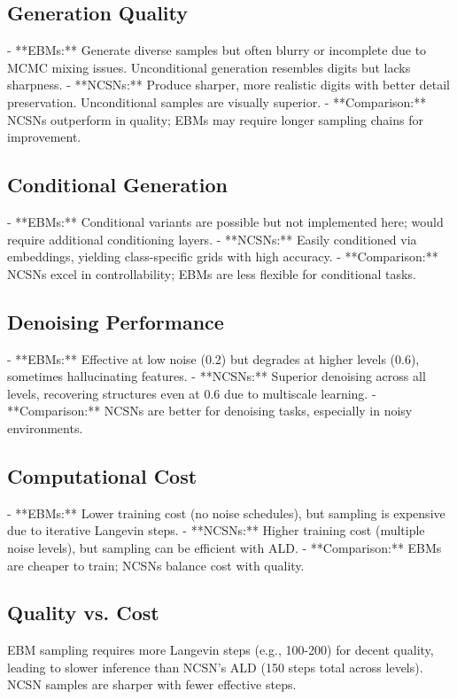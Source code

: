 \documentclass[a4paper,12pt]{article}
\begin{document}
\subsection{Generation Quality}
- **EBMs:** Generate diverse samples but often blurry or incomplete due to MCMC mixing issues. Unconditional generation resembles digits but lacks sharpness.
- **NCSNs:** Produce sharper, more realistic digits with better detail preservation. Unconditional samples are visually superior.
- **Comparison:** NCSNs outperform in quality; EBMs may require longer sampling chains for improvement.

\subsection{Conditional Generation}
- **EBMs:** Conditional variants are possible but not implemented here; would require additional conditioning layers.
- **NCSNs:** Easily conditioned via embeddings, yielding class-specific grids with high accuracy.
- **Comparison:** NCSNs excel in controllability; EBMs are less flexible for conditional tasks.

\subsection{Denoising Performance}
- **EBMs:** Effective at low noise (0.2) but degrades at higher levels (0.6), sometimes hallucinating features.
- **NCSNs:** Superior denoising across all levels, recovering structures even at 0.6 due to multiscale learning.
- **Comparison:** NCSNs are better for denoising tasks, especially in noisy environments.

\subsection{Computational Cost}
- **EBMs:** Lower training cost (no noise schedules), but sampling is expensive due to iterative Langevin steps.
- **NCSNs:** Higher training cost (multiple noise levels), but sampling can be efficient with ALD.
- **Comparison:** EBMs are cheaper to train; NCSNs balance cost with quality.

\subsection{Quality vs. Cost}
EBM sampling requires more Langevin steps (e.g., 100-200) for decent quality, leading to slower inference than NCSN's ALD (150 steps total across levels). NCSN samples are sharper with fewer effective steps.
\end{document}
